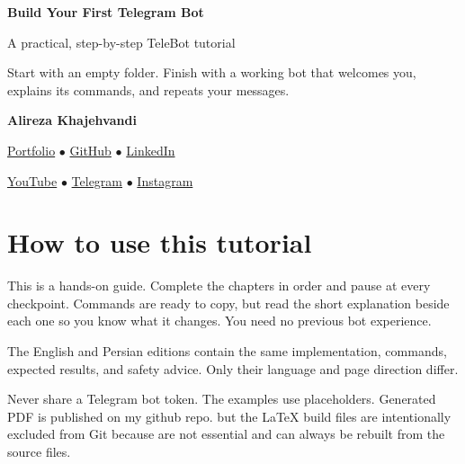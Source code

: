 \documentclass[11pt,openany]{book}
\begin{document}
\begin{titlepage}
\pagecolor{Primary}\color{white}\centering
\vspace*{2.2cm}
{\Huge\bfseries Build Your First Telegram Bot\par}
\vspace{0.5cm}
{\LARGE A practical, step-by-step TeleBot tutorial\par}
\vspace{1.5cm}
\begin{tcolorbox}[width=.82\textwidth,colback=Primary!72!black,colframe=white]
\centering\color{white}\large
Start with an empty folder. Finish with a working bot that welcomes you,
explains its commands, and repeats your messages.
\end{tcolorbox}
\vfill
{\Large\bfseries Alireza Khajehvandi\par}
\vspace{0.35cm}
\hypersetup{urlcolor=white}
\href{https://alirezaaies.github.io/}{Portfolio} $\bullet$
\href{https://github.com/alirezaaies}{GitHub} $\bullet$
\href{https://www.linkedin.com/in/alirezakhajehvandi}{LinkedIn}\par
\href{https://www.youtube.com/@AlirezaAIES}{YouTube} $\bullet$
\href{https://t.me/AlirezaAIES}{Telegram} $\bullet$
\href{https://www.instagram.com/alireza.aies}{Instagram}
\hypersetup{urlcolor=Primary}
\vspace*{1.4cm}
\end{titlepage}
\nopagecolor\color{Ink}

\frontmatter
\chapter*{How to use this tutorial}
This is a hands-on guide. Complete the chapters in order and pause at every
checkpoint. Commands are ready to copy, but read the short explanation beside
each one so you know what it changes. You need no previous bot experience.

The English and Persian editions contain the same implementation, commands,
expected results, and safety advice. Only their language and page direction differ.

\begin{warningbox}
Never share a Telegram bot token. The examples use placeholders. Generated PDF is published on my github repo. but the LaTeX build files are intentionally excluded from Git because are not essential and can always be rebuilt from the source files.
\end{warningbox}
\tableofcontents
\end{document}
